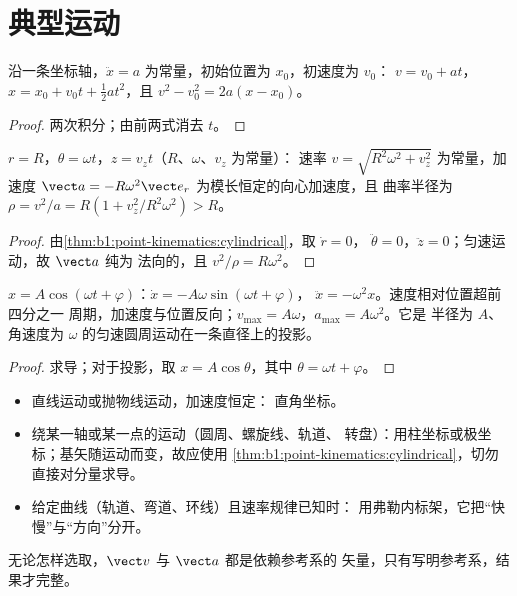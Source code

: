 \section{典型运动}

\begin{proposition}[匀变速直线运动]\label{prop:b1:point-kinematics:uarm}
沿一条坐标轴，$\ddot x = a$ 为常量，初始位置为 $x_0$，初速度为 $v_0$：
$v = v_0 + at$，$x = x_0 + v_0t + \tfrac12 at^2$，且
$v^2 - v_0^2 = 2a(x - x_0)$。
\end{proposition}

\begin{proof}
两次积分；由前两式消去 $t$。
\end{proof}

\begin{proposition}[螺旋运动]\label{prop:b1:point-kinematics:helix}
$r = R$，$\theta = \omega t$，$z = v_zt$（$R$、$\omega$、$v_z$ 为常量）：
速率 $v = \sqrt{R^2\omega^2 + v_z^2}$ 为常量，加速度
$\vect a = -R\omega^2\vect e_r$ 为模长恒定的向心加速度，且
曲率半径为 $\rho = v^2/a = R(1 + v_z^2/R^2\omega^2) > R$。
\end{proposition}

\begin{proof}
由\cref{thm:b1:point-kinematics:cylindrical}，取 $\dot r = 0$，
$\ddot\theta = 0$，$\ddot z = 0$；匀速运动，故 $\vect a$ 纯为
法向的，且 $v^2/\rho = R\omega^2$。
\end{proof}

\begin{proposition}[简谐运动]\label{prop:b1:point-kinematics:harmonic}
$x = A\cos(\omega t + \varphi)$：$\dot x = -A\omega\sin(\omega t + \varphi)$，
$\ddot x = -\omega^2 x$。速度相对位置超前四分之一
周期，加速度与位置反向；$v_{\max} =
A\omega$，$a_{\max} = A\omega^2$。它是
半径为 $A$、角速度为 $\omega$ 的匀速圆周运动在一条直径上的投影。
\end{proposition}

\begin{proof}
求导；对于投影，取 $x = A\cos\theta$，其中 $\theta =
\omega t + \varphi$。
\end{proof}

\begin{method}[选取坐标]\label{met:b1:point-kinematics:choose}
\begin{itemize}
  \item 直线运动或抛物线运动，加速度恒定：
        直角坐标。
  \item 绕某一轴或某一点的运动（圆周、螺旋线、轨道、
        转盘）：用柱坐标或极坐标；基矢随运动而变，故应使用
        \cref{thm:b1:point-kinematics:cylindrical}，切勿
        直接对分量求导。
  \item 给定曲线（轨道、弯道、环线）且速率规律已知时：
        用弗勒内标架，它把“快慢”与“方向”分开。
\end{itemize}
无论怎样选取，$\vect v$ 与 $\vect a$ 都是依赖参考系的
矢量，只有写明参考系，结果才完整。
\end{method}

